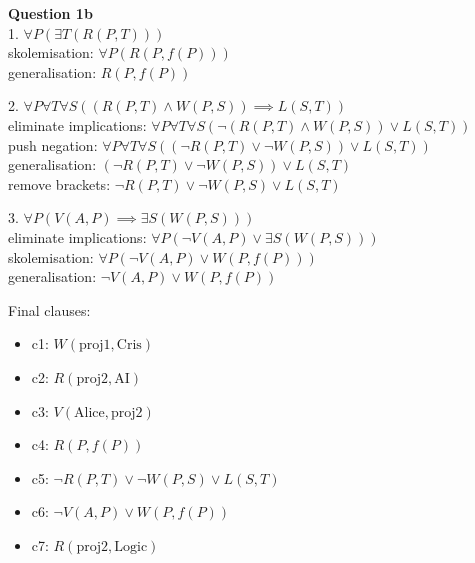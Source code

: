 \documentclass[12pt,a4paper]{article}
\begin{document}
\vspace{1em}


\textbf{Question 1b} \\

1. $\forall P (\exists T (R(P, T)))$ \\
\indent skolemisation: $\forall P (R(P, f(P)))$ \\
\indent generalisation: $R(P, f(P))$

\vspace{1em}

2. $\forall P \forall T \forall S ((R(P, T) \land W(P, S)) \implies L(S, T))$ \\
\indent eliminate implications: $\forall P \forall T \forall S (\neg (R(P, T) \land W(P, S)) \lor L(S, T))$ \\
\indent push negation: $\forall P \forall T \forall S ((\neg R(P, T) \lor \neg W(P, S)) \lor L(S, T))$ \\
\indent generalisation: $(\neg R(P, T) \lor \neg W(P, S)) \lor L(S, T)$ \\
\indent remove brackets: $\neg R(P, T) \lor \neg W(P, S) \lor L(S, T)$

\vspace{1em}

3. $\forall P (V(A, P) \implies \exists S (W(P, S)))$ \\
\indent eliminate implications: $\forall P(\neg V(A, P) \lor \exists S (W(P, S)))$ \\ 
\indent skolemisation: $\forall P (\neg V(A, P) \lor W(P, f(P)))$ \\ 
\indent generalisation: $\neg V(A, P) \lor W(P, f(P))$

\vspace{1em}

Final clauses: \\
\begin{itemize}
    \item c1: $W(\text{proj1}, \text{Cris})$
    \item c2: $R(\text{proj2}, \text{AI})$
    \item c3: $V(\text{Alice}, \text{proj2})$
    \item c4: $R(P, f(P))$
    \item c5: $\neg R(P, T) \lor \neg W(P, S) \lor L(S, T)$
    \item c6: $\neg V(A, P) \lor W(P, f(P))$
    \item c7: $R(\text{proj2}, \text{Logic})$
\end{itemize}
\end{document}

